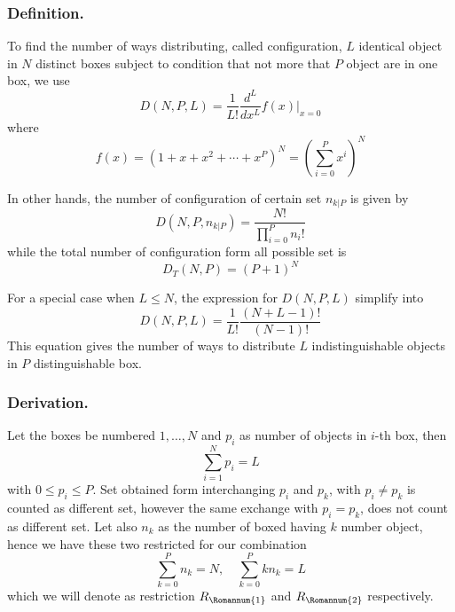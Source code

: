 \documentclass[../../../main.tex]{subfiles}
\begin{document}
\subsubsection{Definition.} To find the number of ways distributing, called configuration, $L$ identical object in $N$ distinct boxes subject to condition that not more that $P$ object are in one box, we use
\begin{equation*}
    D(N,P,L)=\frac{1}{L!}\frac{d^L}{dx^L}f(x)\bigg|_{x=0}
\end{equation*}
where
\begin{equation*}
    f(x)=\left(1+x+x^2+\cdots+ x^P\right)^N=\left(\sum^{P }_{i=0}x^i\right)^N
\end{equation*}

In other hands, the number of configuration of certain set $n_{k|P}$ is given by
\begin{equation*}
    D(N,P,n_{k|P})=\frac{N!}{\displaystyle\prod_{i=0}^{P}n_i!}
\end{equation*}
while the total number of configuration form all possible set is
\begin{equation*}
    D_T(N,P)=(P+1)^N
\end{equation*}

For a special case when $L\leq N$, the expression for $D(N,P,L)$ simplify into
\begin{equation*}
    D(N,P,L)=\frac{1}{L!}\frac{(N+L-1)!}{(N-1)!}
\end{equation*}
This equation gives the number of ways to distribute $L$ indistinguishable objects in $P$ distinguishable box.

\subsubsection{Derivation.} Let the boxes be numbered $1,\dots, N$ and $p_i$ as number of objects in $i$-th box, then
\begin{equation*}
    \sum_{i=1}^{N}p_i=L
\end{equation*}
with $0\leq p_i\leq P$. Set obtained form interchanging $p_i$ and $p_k$, with $p_i\neq p_k$ is counted as different set, however the same exchange with $p_i=p_k$, does not count as different set. Let also $n_k$ as the number of boxed having $k$ number object, hence we have these two restricted for our combination
\begin{equation*}
    \sum_{k=0}^{P}n_k=N,\quad\sum_{k=0 }^{P }kn_k=L
\end{equation*}
which we will denote as restriction $R_\Romannum{1}$ and $R_\Romannum{2}$ respectively.
\end{document}
